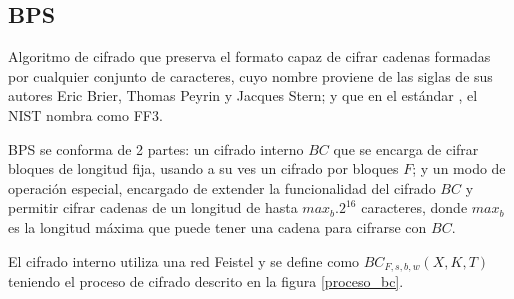 %
%

\subsection{BPS}


Algoritmo de cifrado que preserva el formato capaz de cifrar cadenas formadas
por cualquier conjunto de caracteres, cuyo nombre proviene de las siglas de sus
autores Eric Brier, Thomas Peyrin y Jacques Stern; y que en el estándar
\cite{nist_fpe}, el NIST nombra como FF3.

BPS se conforma de 2 partes: un cifrado interno $BC$ que se encarga de cifrar
bloques de longitud fija, usando a su ves un cifrado por bloques $F$; y un modo
de operación especial, encargado de extender la funcionalidad del cifrado $BC$
y permitir cifrar cadenas de un longitud de hasta $max_b . 2^{16}$ caracteres,
donde $max_b$ es la longitud máxima que puede tener una cadena para cifrarse
con $BC$.

El cifrado interno utiliza una red Feistel y se define como $BC_{F,s,b,w}
(X,K,T)$ teniendo el proceso de cifrado descrito en la figura \ref{proceso_bc}.

